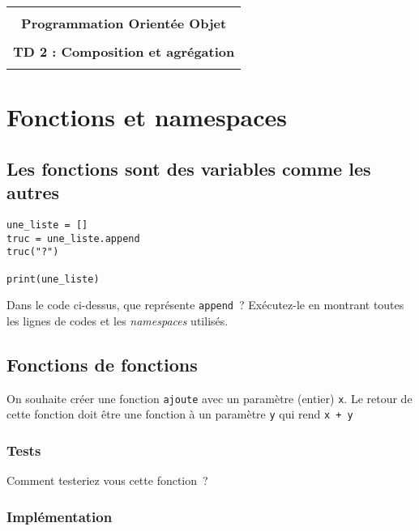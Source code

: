 \documentclass[12pt]{article}
\begin{document}
    \begin{center}
      \begin{tabular}{c}
      \hline
    \\
        {\bf \textsf {\Large Programmation Orientée Objet}}\\
    \\
        {\bf \textsf {\Large TD 2 : Composition et agrégation}}\\
    \\
        \hline
      \end{tabular}
    \end{center}
    \vspace{15mm}

\section{Fonctions et namespaces}

\subsection{Les fonctions sont des variables comme les autres}


\lstset{language=Python}
\begin{lstlisting}
une_liste = []
truc = une_liste.append
truc("?")

print(une_liste)
\end{lstlisting}


Dans le code ci-dessus, que représente \verb|append|~? Exécutez-le en montrant toutes les lignes de codes et les {\em namespaces} utilisés.


\subsection{Fonctions de fonctions}

On souhaite créer une fonction \verb|ajoute| avec un paramètre (entier) \verb|x|. Le retour de cette fonction doit être une fonction à un paramètre \verb|y| qui rend \verb|x + y|

\subsubsection{Tests}

Comment testeriez vous cette fonction~?

\subsubsection{Implémentation}
\end{document}
